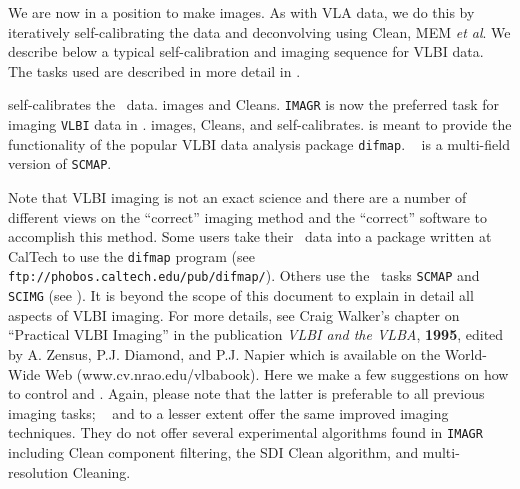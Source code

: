 We are now in a position to make images.  As with VLA data, we do this
by iteratively self-calibrating the data and deconvolving using
Clean, MEM {\it et al}.  We describe below a typical self-calibration
and imaging sequence for VLBI data.  The tasks used are described in
more detail in .

\xben
{} self-calibrates the \uv\ data.
 images and Cleans. {\tt IMAGR} is now
     the preferred task for imaging {\tt VLBI} data in \AIPS\@.
 images, Cleans, and self-calibrates.
     {\tt {}} is meant to provide the functionality of the
     popular VLBI data analysis package {\tt difmap}.  {\tt
     } is a multi-field version of {\tt SCMAP}\@.
\xeen
{}

Note that VLBI imaging is not an exact science and there are a number
of different views on the ``correct'' imaging method and the
``correct'' software to accomplish this method.  Some users take their
\AIPS\ data into a package written at CalTech to use the {\tt difmap}
program (see {\tt ftp://phobos.caltech.edu/pub/difmap/}).  Others use
the \AIPS\ tasks {\tt SCMAP} and {\tt SCIMG} (see ).
It is beyond the scope of this document to explain in detail all
aspects of VLBI imaging.  For more details, see Craig Walker's chapter
on ``Practical VLBI Imaging'' in the publication {\it VLBI and the
VLBA\/}, {\bf 1995}, edited by A. Zensus, P.J. Diamond, and P.J.
Napier which is available on the World-Wide Web
(www.cv.nrao.edu/vlbabook).  Here we make a few suggestions on how to
control {\tt {}} and {\tt {}}\@.  Again, please
note that the latter is preferable to all previous imaging tasks; {\tt
{}} and to a lesser extent {\tt {}} offer the same
improved imaging techniques.  They do not offer several experimental
algorithms found in {\tt IMAGR} including Clean component filtering,
the SDI Clean algorithm, and multi-resolution Cleaning.

